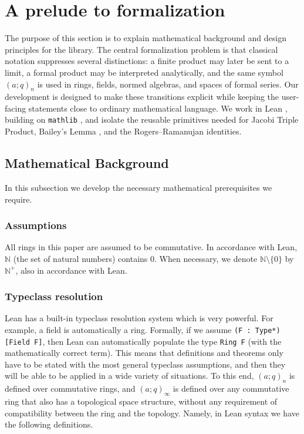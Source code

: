 \documentclass[12pt]{amsart}
\theoremstyle{definition}
\theoremstyle{remark}
\numberwithin{equation}{subsection}
\newcommand{\N}{\mathbb N}
\begin{document}
\section{A prelude to formalization}

The purpose of this section is to explain mathematical background and design principles for the library. The central formalization problem is that classical notation suppresses several distinctions: a finite product may later be sent to a limit, a formal product may be interpreted analytically, and the same symbol $(a;q)_n$ is used in rings, fields, normed algebras, and spaces of formal series.  Our development is designed to make these transitions explicit while keeping the user-facing statements close to ordinary mathematical language.  We work in Lean \cite{Lean}, building on \texttt{mathlib} \cite{Mathlib2020}, and isolate the reusable primitives needed for Jacobi Triple Product, Bailey's Lemma \cite{Bailey1949}, and the Rogers--Ramanujan identities.

\subsection{Mathematical Background} In this subsection we develop the necessary mathematical prerequisites we require.

\subsubsection{Assumptions}

All rings in this paper are assumed to be commutative. In accordance with Lean, $\N$ (the set of natural numbers) contains $0$. When necessary, we denote $\N \setminus \{0\}$ by $\N^+$, also in accordance with Lean.

\subsubsection{Typeclass resolution}

Lean has a built-in typeclass resolution system \cite{SelsamTypeclass} which is very powerful. For example, a field is automatically a ring. Formally, if we assume \texttt{(F : Type*) [Field F]}, then Lean can automatically populate the type \texttt{Ring F} (with the mathematically correct term). This means that definitions and theorems only have to be stated with the most general typeclass assumptions, and then they will be able to be applied in a wide variety of situations. To this end, $(a; q)_n$ is defined over commutative rings, and $(a; q)_\infty$ is defined over any commutative ring that also has a topological space structure, without any requirement of compatibility between the ring and the topology. Namely, in Lean syntax we have the following definitions.
\end{document}
